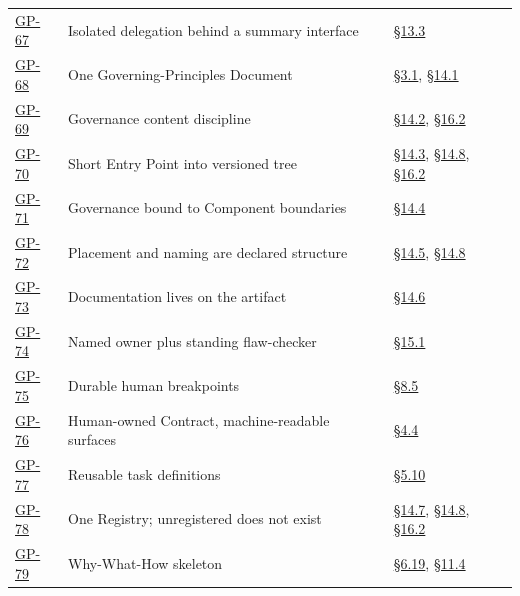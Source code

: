 \begin{longtable}{@{}p{} p{} p{}@{}}
\hyperlink{gp-67}{GP-67} & Isolated delegation behind a summary interface & \hyperlink{nss-13.3}{\S13.3} \\

\hyperlink{gp-68}{GP-68} & One Governing-Principles Document & \hyperlink{nss-3.1}{\S3.1}, \hyperlink{nss-14.1}{\S14.1} \\

\hyperlink{gp-69}{GP-69} & Governance content discipline & \hyperlink{nss-14.2}{\S14.2}, \hyperlink{nss-16.2}{\S16.2} \\

\hyperlink{gp-70}{GP-70} & Short Entry Point into versioned tree & \hyperlink{nss-14.3}{\S14.3}, \hyperlink{nss-14.8}{\S14.8}, \hyperlink{nss-16.2}{\S16.2} \\

\hyperlink{gp-71}{GP-71} & Governance bound to Component boundaries & \hyperlink{nss-14.4}{\S14.4} \\

\hyperlink{gp-72}{GP-72} & Placement and naming are declared structure & \hyperlink{nss-14.5}{\S14.5}, \hyperlink{nss-14.8}{\S14.8} \\

\hyperlink{gp-73}{GP-73} & Documentation lives on the artifact & \hyperlink{nss-14.6}{\S14.6} \\

\hyperlink{gp-74}{GP-74} & Named owner plus standing flaw-checker & \hyperlink{nss-15.1}{\S15.1} \\

\hyperlink{gp-75}{GP-75} & Durable human breakpoints & \hyperlink{nss-8.5}{\S8.5} \\

\hyperlink{gp-76}{GP-76} & Human-owned Contract, machine-readable surfaces & \hyperlink{nss-4.4}{\S4.4} \\

\hyperlink{gp-77}{GP-77} & Reusable task definitions & \hyperlink{nss-5.10}{\S5.10} \\

\hyperlink{gp-78}{GP-78} & One Registry; unregistered does not exist & \hyperlink{nss-14.7}{\S14.7}, \hyperlink{nss-14.8}{\S14.8}, \hyperlink{nss-16.2}{\S16.2} \\

\hyperlink{gp-79}{GP-79} & Why-What-How skeleton & \hyperlink{nss-6.19}{\S6.19}, \hyperlink{nss-11.4}{\S11.4} \\

\bottomrule

\end{longtable}

